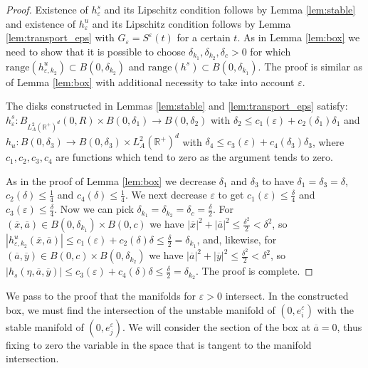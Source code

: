 \documentclass[11pt, leqno]{amsart}
\theoremstyle{definition}
\def\R{\mathbb{R}}
\begin{document}
\begin{proof}
	Existence of $h^s_\varepsilon$ and its Lipschitz condition follows by Lemma \ref{lem:stable} and existence of $h^u_{\varepsilon}$ and its Lipschitz condition follows by Lemma \ref{lem:transport_eps} with $G_\varepsilon = S^\varepsilon(t)$ for a certain $t$. As in Lemma \ref{lem:box} we need to show that it is possible to choose $\delta_{k_1}, \delta_{k_2}, \delta_c > 0$ for which $\text{range}(h^u_{\varepsilon,k_2})\subset  B(0,\delta_{k_2})$ and $\text{range}(h^s) \subset B(0,\delta_{k_1})$. The proof is similar as of Lemma \ref{lem:box} with additional necessity to take into account $\varepsilon$. 
	
	The disks constructed in  Lemmas \ref{lem:stable} and \ref{lem:transport_eps} satisfy: $h^s_\varepsilon:B_{L^2_A( \R^+)^d}(0,R)\times B(0,\delta_1)\to B(0,\delta_2)$ with $\delta_2 \leq c_1(\varepsilon)+c_2(\delta_1)\delta_1$ and $h_u:B(0,\delta_3)\to B(0,\delta_3)\times L^2_A(\R^+)^d$ with $\delta_4 \leq c_3(\varepsilon) + c_4(\delta_3)\delta_3$, where $c_1, c_2, c_3, c_4$ are functions which tend to zero as the argument tends to zero. 
	
	As in the proof of Lemma \ref{lem:box} we decrease $\delta_1$ and $\delta_3$ to have $\delta_1=\delta_3=\delta$,  $c_2(\delta)\leq \frac{1}{4}$ and $c_4(\delta)\leq \frac{1}{4}$. We next decrease $\varepsilon$ to get $c_1(\varepsilon) \leq \frac{\delta}{4}$ and $c_3(\varepsilon) \leq \frac{\delta}{4}$. Now we can pick $\delta_{k_1} = \delta_{k_2} = \delta_c = \frac{\delta}{2}$. 
	For $(\overline{x},\overline{a}) \in B(0,\delta_{k_1})\times B(0,c)$ we have $|\overline{x}|^2+|\overline{a}|^2\leq \frac{\delta^2}{2} < \delta^2$, so 
	$|h^u_{\varepsilon,k_2}(\overline{x},\overline{a})|\leq c_1(\varepsilon)+c_2(\delta)\delta \leq \frac{\delta}{2} = \delta_{k_1}$, and, likewise, for $(\overline{a},\overline{y}) \in B(0,c)\times B(0,\delta_{k_2})$ we have $|\overline{a}|^2+|\overline{y}|^2\leq \frac{\delta^2}{2} < \delta^2$, so 
	$|h_s(\eta,\overline{a},\overline{y})|\leq c_3(\varepsilon)+c_4(\delta)\delta \leq \frac{\delta}{2} = \delta_{k_2}$. The proof is complete. 
	\end{proof}	 			
We pass to the proof that the manifolds for $\varepsilon>0$ intersect. In the constructed box, we must find the intersection of the unstable manifold of $(0,e^\varepsilon_i)$ with the stable manifold of $(0,e^\varepsilon_j)$. We will consider the section of the box at $\overline{a}=0$, thus fixing to zero the variable in the space that is tangent to the manifold intersection.  
\end{document}
